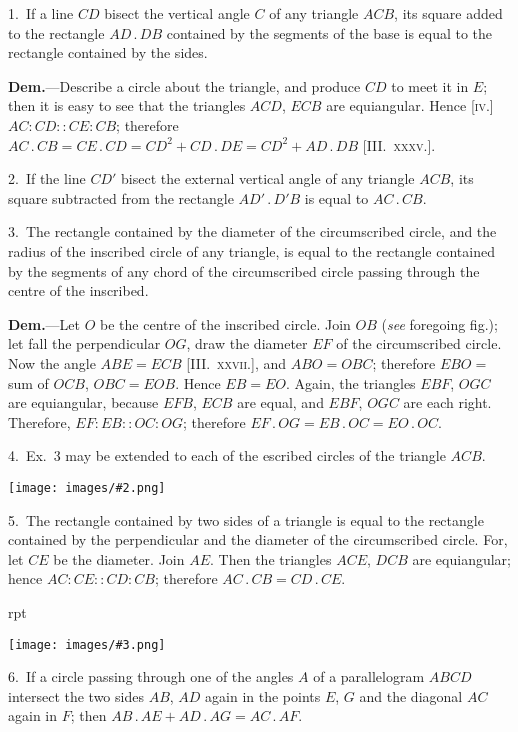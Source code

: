\documentclass[oneside]{book}
\newcounter{wrapwidth}
\newcommand\imgflow[3]{
\setcounter{wrapwidth}{#1}
\begin{wrapfigure}[#2]{r}{\value{wrapwidth}pt}
\begin{center}
\vspace{-0.3in}
\texttt{[image: images/\#3.png]}
\end{center}
\end{wrapfigure}
}
\newcommand\imgcent[2]{
\begin{center}
\texttt{[image: images/\#2.png]}
\end{center}
}
\begin{document}
\begin{footnotesize}
1.~If a line $CD$ bisect the vertical angle $C$ of any triangle $ACB$,
its square added to the rectangle $AD\,.\,DB$
contained by the segments of the base is
equal to the rectangle contained by the
sides.

\textbf{Dem.}---Describe a circle about the triangle,
and produce $CD$ to meet it in $E$;
then it is easy to see that the triangles
$ACD$, $ECB$ are equiangular. Hence [\textsc{iv.}]
$AC:CD::CE:CB$; therefore $AC\,.\,CB
= CE\,.\,CD = CD^2 + CD\,.\,DE = CD^2 +
AD\,.\,DB$ [III\@.~\textsc{xxxv.}].

2.~If the line $CD'$ bisect the external vertical angle of any triangle
$ACB$, its square subtracted from the rectangle $AD'\,.\,D'B$
is equal to $AC\,.\,CB$.

3.~The rectangle contained by the diameter of the circumscribed
circle, and the radius of the inscribed circle of any triangle,
is equal to the rectangle contained by the segments of any
chord of the circumscribed circle passing through the centre of
the inscribed.

\textbf{Dem.}---Let $O$ be the centre of the inscribed circle. Join $OB$
(\emph{see} foregoing fig.); let fall the perpendicular $OG$, draw the diameter
$EF$ of the circumscribed circle. Now the angle $ABE = ECB$
[III\@.~\textsc{xxvii.}], and $ABO = OBC$; therefore $EBO =$ sum of $OCB$,
$OBC = EOB$. Hence $EB = EO$. Again, the triangles $EBF$, $OGC$
are equiangular, because $EFB$, $ECB$ are equal, and $EBF$, $OGC$
are each right. Therefore, $EF:EB::OC:OG$; therefore
$EF\,.\,OG = EB\,.\,OC = EO\,.\,OC$.

4.~Ex.~3 may be extended to each of the escribed circles of the
triangle $ACB$.

\imgcent{100}{f191}

5.~The rectangle contained by two sides of a triangle is equal
to the rectangle contained by the perpendicular
and the diameter of the circumscribed
circle. For, let $CE$ be the diameter.
Join $AE$. Then the triangles $ACE$, $DCB$
are equiangular; hence $AC:CE::CD:CB$;
therefore $AC\,.\,CB = CD\,.\,CE$.

\imgflow{115}{13}{f192}

6.~If a circle passing through one of
the angles $A$ of a parallelogram $ABCD$
intersect the two sides $AB$, $AD$ again in
the points $E$, $G$ and the diagonal $AC$ again in $F$; then $AB\,.\,AE
+ AD\,.\,AG = AC\,.\,AF$.



\end{footnotesize}
\end{document}
